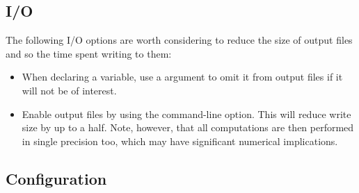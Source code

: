 \subsection{I/O}

The following I/O options are worth considering to reduce the size of output
files and so the time spent writing to them:
\begin{itemize}
\item When declaring a variable, use a  argument to omit
  it from output files if it will not be of interest.
\item Enable  output files by using the
   command-line option. This will reduce write size by
  up to a half. Note, however, that all computations are then performed in
  single precision too, which may have significant numerical implications.
\end{itemize}

\subsection{Configuration}

